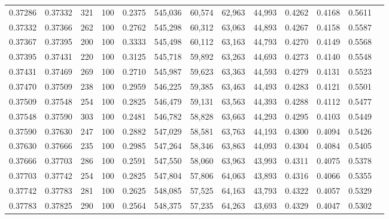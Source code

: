 \begin{tabular}{rrrrrrrrrrrrr}
0.37286 & 0.37332 &   321 & 100 &                                     0.2375 & 545,036 &  60,574 &  62,963 &  44,993 & 0.4262 & 0.4168 & 0.5611 \\
0.37332 & 0.37366 &   262 & 100 &                                     0.2762 & 545,298 &  60,312 &  63,063 &  44,893 & 0.4267 & 0.4158 & 0.5587 \\
0.37367 & 0.37395 &   200 & 100 &                                     0.3333 & 545,498 &  60,112 &  63,163 &  44,793 & 0.4270 & 0.4149 & 0.5568 \\
0.37395 & 0.37431 &   220 & 100 &                                     0.3125 & 545,718 &  59,892 &  63,263 &  44,693 & 0.4273 & 0.4140 & 0.5548 \\
0.37431 & 0.37469 &   269 & 100 &                                     0.2710 & 545,987 &  59,623 &  63,363 &  44,593 & 0.4279 & 0.4131 & 0.5523 \\
0.37470 & 0.37509 &   238 & 100 &                                     0.2959 & 546,225 &  59,385 &  63,463 &  44,493 & 0.4283 & 0.4121 & 0.5501 \\
0.37509 & 0.37548 &   254 & 100 &                                     0.2825 & 546,479 &  59,131 &  63,563 &  44,393 & 0.4288 & 0.4112 & 0.5477 \\
0.37548 & 0.37590 &   303 & 100 &                                     0.2481 & 546,782 &  58,828 &  63,663 &  44,293 & 0.4295 & 0.4103 & 0.5449 \\
0.37590 & 0.37630 &   247 & 100 &                                     0.2882 & 547,029 &  58,581 &  63,763 &  44,193 & 0.4300 & 0.4094 & 0.5426 \\
0.37630 & 0.37666 &   235 & 100 &                                     0.2985 & 547,264 &  58,346 &  63,863 &  44,093 & 0.4304 & 0.4084 & 0.5405 \\
0.37666 & 0.37703 &   286 & 100 &                                     0.2591 & 547,550 &  58,060 &  63,963 &  43,993 & 0.4311 & 0.4075 & 0.5378 \\
0.37703 & 0.37742 &   254 & 100 &                                     0.2825 & 547,804 &  57,806 &  64,063 &  43,893 & 0.4316 & 0.4066 & 0.5355 \\
0.37742 & 0.37783 &   281 & 100 &                                     0.2625 & 548,085 &  57,525 &  64,163 &  43,793 & 0.4322 & 0.4057 & 0.5329 \\
0.37783 & 0.37825 &   290 & 100 &                                     0.2564 & 548,375 &  57,235 &  64,263 &  43,693 & 0.4329 & 0.4047 & 0.5302 \\

\end{tabular}

